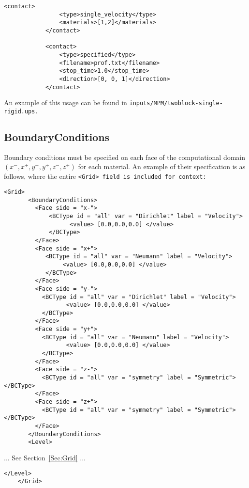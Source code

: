 \begin{Verbatim}[fontsize=\footnotesize]
            <contact>
                <type>single_velocity</type>
                <materials>[1,2]</materials>
            </contact>

            <contact>
                <type>specified</type>
                <filename>prof.txt</filename>
                <stop_time>1.0</stop_time>
                <direction>[0, 0, 1]</direction>
            </contact>
\end{Verbatim}
An example of this usage can be found in \tt inputs/MPM/twoblock-single-rigid.ups. \normalfont

\subsection{BoundaryConditions} \label{Sec:MPM_BCs}

Boundary conditions must be specified on each face of the computational
domain $(x^-, x^+, y^-, y^+,z^-,z^+)$ for each material.  An example of their
specification is as follows, where the entire \tt <Grid> \normalfont field
is included for context:
\begin{Verbatim}[fontsize=\footnotesize]
    <Grid>
       <BoundaryConditions>
         <Face side = "x-">
             <BCType id = "all" var = "Dirichlet" label = "Velocity">
                   <value> [0.0,0.0,0.0] </value>
             </BCType>
         </Face>
         <Face side = "x+">
            <BCType id = "all" var = "Neumann" label = "Velocity">
                 <value> [0.0,0.0,0.0] </value>
            </BCType>
         </Face>
         <Face side = "y-">
           <BCType id = "all" var = "Dirichlet" label = "Velocity">
                  <value> [0.0,0.0,0.0] </value>
           </BCType>
         </Face>
         <Face side = "y+">
           <BCType id = "all" var = "Neumann" label = "Velocity">
                  <value> [0.0,0.0,0.0] </value>
           </BCType>
         </Face>
         <Face side = "z-">
           <BCType id = "all" var = "symmetry" label = "Symmetric"> </BCType>
         </Face>
         <Face side = "z+">
           <BCType id = "all" var = "symmetry" label = "Symmetric"> </BCType>
         </Face>
       </BoundaryConditions>
       <Level>
\end{Verbatim}

... See Section~\ref{Sec:Grid} ...

\begin{Verbatim}[fontsize=\footnotesize]
       </Level>
    </Grid>
\end{Verbatim}

